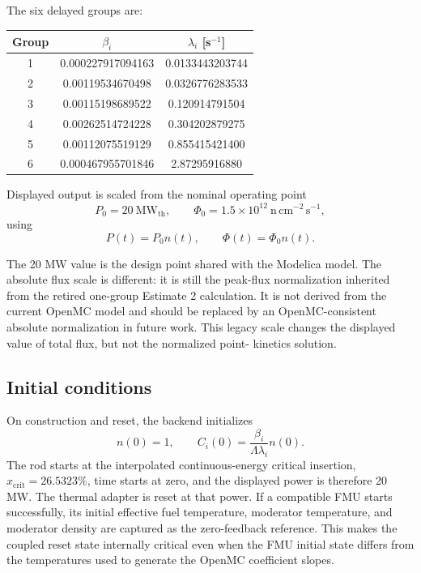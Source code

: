 \documentclass[11pt]{article}
\begin{document}
The six delayed groups are:

\begin{center}
\begin{tabular}{ccc}
\toprule
Group & $\beta_i$ & $\lambda_i$ [s$^{-1}$] \\
\midrule
1 & 0.000227917094163 & 0.0133443203744 \\
2 & 0.00119534670498 & 0.0326776283533 \\
3 & 0.00115198689522 & 0.120914791504 \\
4 & 0.00262514724228 & 0.304202879275 \\
5 & 0.00112075519129 & 0.855415421400 \\
6 & 0.000467955701846 & 2.87295916880 \\
\bottomrule
\end{tabular}
\end{center}

Displayed output is scaled from the nominal operating point
\[
P_0 = 20\ \mathrm{MW_{th}}, \qquad
\Phi_0 = 1.5\times 10^{12}\ \mathrm{n\,cm^{-2}\,s^{-1}},
\]
using
\[
P(t) = P_0 n(t), \qquad \Phi(t) = \Phi_0 n(t).
\]

The 20 MW value is the design point shared with the Modelica model.  The
absolute flux scale is different: it is still the peak-flux normalization
inherited from the retired one-group Estimate 2 calculation.  It is not
derived from the current OpenMC model and should be replaced by an
OpenMC-consistent absolute normalization in future work.  This legacy scale
changes the displayed value of total flux, but not the normalized point-
kinetics solution.

\subsection{Initial conditions}

On construction and reset, the backend initializes
\[
n(0)=1,\qquad
C_i(0)=\frac{\beta_i}{\Lambda\lambda_i}n(0).
\]
The rod starts at the interpolated continuous-energy critical insertion,
$x_{\mathrm{crit}}=26.5323\%$, time starts at zero, and the displayed power is
therefore 20 MW.  The thermal adapter is reset at that power.  If a compatible
FMU starts successfully, its initial effective fuel temperature, moderator
temperature, and moderator density are captured as the zero-feedback
reference.  This makes the coupled reset state internally critical even when
the FMU initial state differs from the temperatures used to generate the
OpenMC coefficient slopes.
\end{document}
